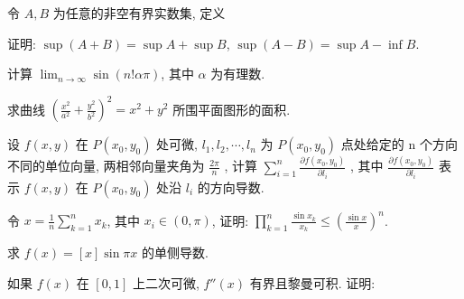 \par{}
令 $A, B$ 为任意的非空有界实数集, 定义\par
\nopagebreak[4]
证明: $\sup (A + B) = \sup A + \sup B$, $\sup (A - B) = \sup A - \inf B$.\par
计算 $\lim_{n\to \infty}\sin (n!\alpha \pi)$, 其中 $\alpha$ 为有理数.\par
求曲线 $\left(\frac{x^2}{a^2} + \frac{y^2}{b^2}\right)^2 = x^2 + y^2$ 所围平面图形的面积.\par
设  $f(x,y)$  在  $P(x_{0},y_{0})$  处可微,  $l_{1},l_{2},\cdots,l_{n}$  为  $P(x_{0},y_{0})$  点处给定的 n 个方向不同的单位向量, 两相邻向量夹角为  $\frac{2\pi}{n}$ , 计算  $\sum_{i=1}^{n}\frac{\partial f(x_{0},y_{0})}{\partial l_{i}}$ , 其中  $\frac{\partial f(x_{0},y_{0})}{\partial l_{i}}$  表示  $f(x,y)$  在  $P(x_{0},y_{0})$  处沿  $l_{i}$  的方向导数.\par
令 $x = \frac{1}{n} \sum_{k=1}^{n} x_k$, 其中 $x_i \in (0, \pi)$, 证明: $\prod_{k=1}^{n} \frac{\sin x_k}{x_k} \leq \left(\frac{\sin x}{x}\right)^n$.\par
求 $f(x) = [x] \sin \pi x$ 的单侧导数.\par
\par{}
如果 $f(x)$ 在 $[0,1]$ 上二次可微, $f''(x)$ 有界且黎曼可积. 证明:\par
\nopagebreak[4]
\par{}

